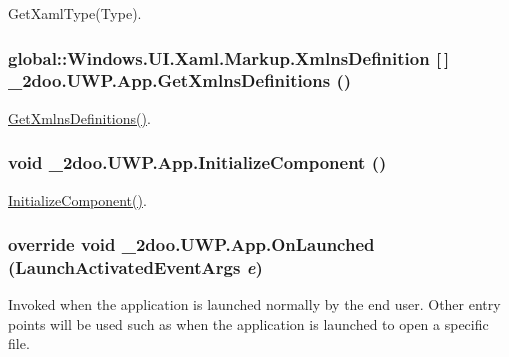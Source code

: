 GetXamlType(Type). 

\hypertarget{class__2doo_1_1_u_w_p_1_1_app_8dc1645a83a050e1a2fde7ce645f443c}{
\subsubsection[{GetXmlnsDefinitions}]{\setlength{\rightskip}{0pt plus 5cm}global::Windows.UI.Xaml.Markup.XmlnsDefinition \mbox{[}$\,$\mbox{]} \_\-2doo.UWP.App.GetXmlnsDefinitions ()}}
\label{class__2doo_1_1_u_w_p_1_1_app_8dc1645a83a050e1a2fde7ce645f443c}


\hyperlink{class__2doo_1_1_u_w_p_1_1_app_8dc1645a83a050e1a2fde7ce645f443c}{GetXmlnsDefinitions()}. 

\hypertarget{class__2doo_1_1_u_w_p_1_1_app_75c48512b7698dc3adc4c9613faf9705}{
\subsubsection[{InitializeComponent}]{\setlength{\rightskip}{0pt plus 5cm}void \_\-2doo.UWP.App.InitializeComponent ()}}
\label{class__2doo_1_1_u_w_p_1_1_app_75c48512b7698dc3adc4c9613faf9705}


\hyperlink{class__2doo_1_1_u_w_p_1_1_app_75c48512b7698dc3adc4c9613faf9705}{InitializeComponent()}. 

\hypertarget{class__2doo_1_1_u_w_p_1_1_app_fb3a2a0edc517e7505e611ff4ae0e8c2}{
\subsubsection[{OnLaunched}]{\setlength{\rightskip}{0pt plus 5cm}override void \_\-2doo.UWP.App.OnLaunched (LaunchActivatedEventArgs {\em e})}}
\label{class__2doo_1_1_u_w_p_1_1_app_fb3a2a0edc517e7505e611ff4ae0e8c2}


Invoked when the application is launched normally by the end user. Other entry points will be used such as when the application is launched to open a specific file. 

